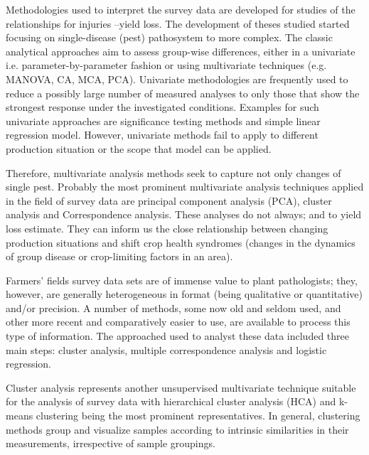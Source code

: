 Methodologies used to interpret the survey data are developed for studies of the relationships for injuries --yield loss. The development of theses studied started focusing on single-disease (pest) pathosystem to more complex. The classic analytical approaches aim to assess group-wise differences, either in a univariate i.e. parameter-by-parameter fashion or using multivariate techniques (e.g. MANOVA, CA, MCA, PCA). Univariate methodologies are frequently used to reduce a possibly large number of measured analyses to only those that show the strongest response under the investigated conditions. Examples for such univariate approaches are significance testing methods and simple linear regression model. However, univariate methods fail to apply to different production situation or the scope that model can be applied.


Therefore, multivariate analysis methods seek to capture not only changes of single pest. Probably the most prominent multivariate analysis techniques applied in the field of survey data are principal component analysis (PCA), cluster analysis and Correspondence analysis. These analyses do not always; and to yield loss estimate. They can inform us the close relationship between changing production situations and shift crop health syndromes (changes in the dynamics of group disease or crop-limiting factors in an area). 

Farmers' fields survey data sets are of immense value to plant pathologists; they, however, are generally heterogeneous in format (being qualitative or quantitative) and/or precision. A number of methods, some now old and seldom used, and other more recent and comparatively easier to use, are available to process this type of information. The approached used to analyst these data included three main steps: cluster analysis, multiple correspondence analysis and logistic regression.

Cluster analysis represents another unsupervised multivariate technique suitable for the analysis of survey data with hierarchical cluster analysis (HCA) and k-means clustering  being the most prominent representatives. In general, clustering methods group and visualize samples according to intrinsic similarities in their measurements, irrespective of sample groupings. 

